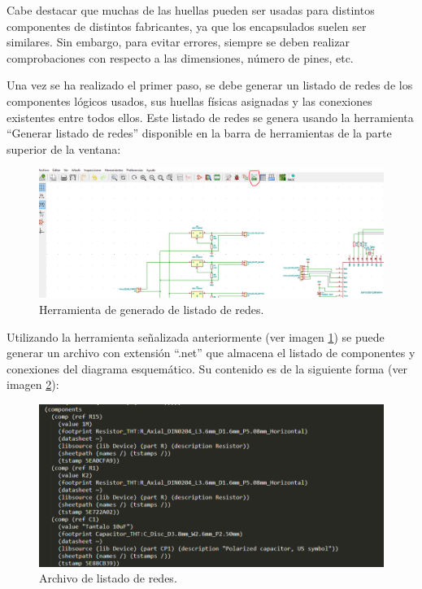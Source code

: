 Cabe destacar que muchas de las huellas pueden ser usadas para distintos componentes de distintos fabricantes, ya que los encapsulados suelen ser similares. Sin embargo, para evitar errores, siempre se deben realizar comprobaciones con respecto a las dimensiones, número de pines, etc.

Una vez se ha realizado el primer paso, se debe generar un listado de redes de los componentes lógicos usados, sus huellas físicas asignadas y las conexiones existentes entre todos ellos. Este listado de redes se genera usando la herramienta ``Generar listado de redes'' disponible en la barra de herramientas de la parte superior de la ventana:

\begin{figure}[H]
\centering 
\includegraphics[width=0.9\linewidth]{pictures/GenerarRed.PNG}
\caption{Herramienta de generado de listado de redes.}
\label{fig:Herramienta_Generar_Red}
\end{figure}

Utilizando la herramienta señalizada anteriormente (ver imagen \ref{fig:Herramienta_Generar_Red}) se puede generar un archivo con extensión ``.net'' que almacena el listado de componentes y conexiones del diagrama esquemático. Su contenido es de la siguiente forma (ver imagen \ref{fig:Archivo_Redes}):

\begin{figure}[H]
\centering 
\includegraphics[width=0.9\linewidth]{pictures/net.PNG}
\caption{Archivo de listado de redes.}
\label{fig:Archivo_Redes}
\end{figure}

